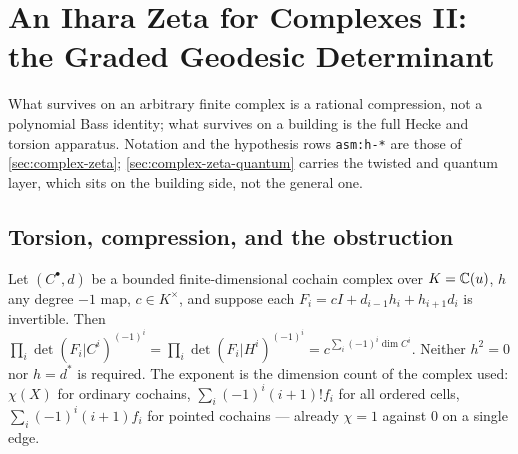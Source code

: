 
\section{An Ihara Zeta for Complexes II: the Graded Geodesic Determinant}
\label{sec:complex-zeta-graded}

What survives on an arbitrary finite complex is a rational compression, not a
polynomial Bass identity; what survives on a building is the full Hecke and
torsion apparatus. Notation and the hypothesis rows \texttt{asm:h-*} are those
of \cref{sec:complex-zeta}; \cref{sec:complex-zeta-quantum} carries the twisted
and quantum layer, which sits on the building side, not the general one.

\subsection{Torsion, compression, and the obstruction}
\begin{theorem}
\label{thm:cochain-cancellation}
Let $(C^\bullet,d)$ be a bounded finite-dimensional cochain complex over
$K = \mathbb C(u)$, $h$ any degree $-1$ map, $c\in K^\times$, and suppose each
$F_i = cI+d_{i-1}h_i+h_{i+1}d_i$ is invertible. Then
$\prod_i\det(F_i|C^i)^{(-1)^i} = \prod_i\det(F_i|H^i)^{(-1)^i}
= c^{\sum_i(-1)^i\dim C^i}$. Neither $h^2 = 0$ nor $h = d^*$ is required. The
exponent is the dimension count of the complex used: $\chi(X)$ for ordinary
cochains, $\sum_i(-1)^i(i+1)!f_i$ for all ordered cells, $\sum_i(-1)^i(i+1)f_i$
for pointed cochains --- already $\chi = 1$ against $0$ on a single edge.
\end{theorem}

